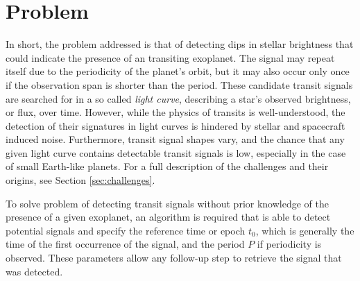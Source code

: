 
\section{Problem}

In short, the problem addressed is that of detecting dips in stellar brightness that could indicate the presence of an transiting exoplanet. The signal may repeat itself due to the periodicity of the planet's orbit, but it may also occur only once if the observation span is shorter than the period. These candidate transit signals are searched for in a so called \textit{light curve}, describing a star's observed brightness, or flux, over time.  However, while the physics of transits is well-understood, the detection of their signatures in light curves is hindered by stellar and spacecraft induced noise. Furthermore, transit signal shapes vary, and the chance that any given light curve contains detectable transit signals is low, especially in the case of small Earth-like planets. For a full description of the challenges and their origins, see Section \ref{sec:challenges}. 

To solve problem of detecting transit signals without prior knowledge of the presence of a given exoplanet, an algorithm is required that is able to detect potential signals and specify the reference time or epoch $t_0$, which is generally the time of the first occurrence of the signal, and the period $P$ if periodicity is observed. These parameters allow any follow-up step to retrieve the signal that was detected.